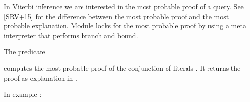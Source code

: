 \documentclass[letterpaper,10pt,english]{sphinxmanual}
\begin{document}
\sphinxAtStartPar
In Viterbi inference we are interested in the most probable proof of a query. See {[}\hyperlink{cite.index:id48}{SRV+15}{]}
for the difference between the most probable proof and the most probable explanation.
Module  looks for the most probable proof by using a meta interpreter
that performs branch and bound.

\sphinxAtStartPar
The predicate

\begin{sphinxVerbatim}[commandchars=\\\{\}]
  
\end{sphinxVerbatim}

\sphinxAtStartPar
computes the most probable proof of the conjunction of literals .
It returns the proof as explanation in .

\sphinxAtStartPar
In example :

\begin{sphinxVerbatim}[commandchars=\\\{\}]
 

 

 

   
   


 
\end{sphinxVerbatim}
\end{document}
